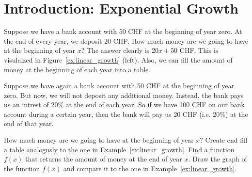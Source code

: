 \section*{Introduction: Exponential Growth}
\begin{example} \label{ex:linear_growth}
	Suppose we have a bank account with 50 CHF at the beginning of year zero.
	At the end of every year, we deposit 20 CHF.
	How much money are we going to have at the beginning of year $x$?
	The answer clearly is $20x+50$ CHF.
	This is visulaized in Figure~\ref{ex:linear_growth} (left).
	Also, we can fill the amount of money at the beginning of each year into a table.
	\begin{figure}[ht]
	\centering
	\end{figure}
\end{example}
\begin{exercise} \label{ex:exponential_growth}
	Suppose we have again a bank account with 50 CHF at the beginning of year zero.
	But now, we will not deposit any additional money.
	Instead, the bank pays us an intrest of 20\% at the end of each year.
	So if we have 100 CHF on our bank account during a certain year, then the bank will pay us 20 CHF (i.e. 20\%) at the end of that year.
	\begin{tasks}
		\task How much money are we going to have at the beginning of year $x$? Create end fill a table analogusly to the one in Example~\ref{ex:linear_growth}.
		\task Find a function $f\left(x\right)$ that returns the amount of money at the end of year $x$.
		\task Draw the graph of the function $f\left(x\right)$ and compare it to the one in Example~\ref{ex:linear_growth}.
	\end{tasks}
\end{exercise}
